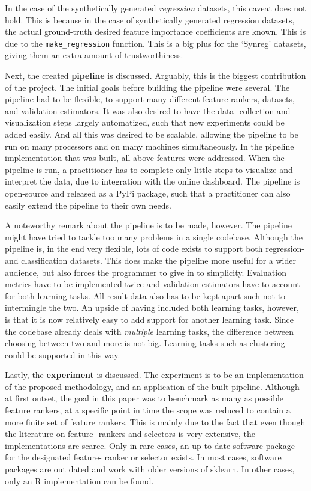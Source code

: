 \documentclass[../main.tex]{subfiles}
\begin{document}
In the case of the synthetically generated \textit{regression} datasets, this caveat does not hold. This is because in the case of synthetically generated regression datasets, the actual ground-truth desired feature importance coefficients are known. This is due to the \texttt{make\_regression} function. This is a big plus for the `Synreg' datasets, giving them an extra amount of trustworthiness.


Next, the created \textbf{pipeline} is discussed. Arguably, this is the biggest contribution of the project. The initial goals before building the pipeline were several. The pipeline had to be flexible, to support many different feature rankers, datasets, and validation estimators. It was also desired to have the data- collection and visualization steps largely automatized, such that new experiments could be added easily. And all this was desired to be scalable, allowing the pipeline to be run on many processors and on many machines simultaneously. In the pipeline implementation that was built, all above features were addressed. When the pipeline is run, a practitioner has to complete only little steps to visualize and interpret the data, due to integration with the online dashboard. The pipeline is open-source and released as a PyPi package, such that a practitioner can also easily extend the pipeline to their own needs.

A noteworthy remark about the pipeline is to be made, however. The pipeline might have tried to tackle too many problems in a single codebase. Although the pipeline is, in the end very flexible, lots of code exists to support both regression- and classification datasets. This does make the pipeline more useful for a wider audience, but also forces the programmer to give in to simplicity. Evaluation metrics have to be implemented twice and validation estimators have to account for both learning tasks. All result data also has to be kept apart such not to intermingle the two. An upside of having included both learning tasks, however, is that it is now relatively easy to add support for another learning task. Since the codebase already deals with \textit{multiple} learning tasks, the difference between choosing between two and more is not big. Learning tasks such as clustering could be supported in this way. 


Lastly, the \textbf{experiment} is discussed. The experiment is to be an implementation of the proposed methodology, and an application of the built pipeline. Although at first outset, the goal in this paper was to benchmark as many as possible feature rankers, at a specific point in time the scope was reduced to contain a more finite set of feature rankers. This is mainly due to the fact that even though the literature on feature- rankers and selectors is very extensive, the implementations are scarce. Only in rare cases, an up-to-date software package for the designated feature- ranker or selector exists. In most cases, software packages are out dated and work with older versions of sklearn. In other cases, only an R implementation can be found.
\end{document}
